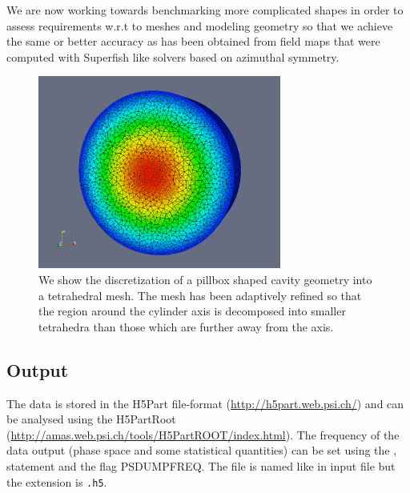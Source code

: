 We are now working towards benchmarking more complicated shapes in order to
assess requirements w.r.t to meshes and modeling geometry so that we
achieve the same or better accuracy as has been obtained from field
maps that were computed with Superfish like solvers based on azimuthal symmetry.

\begin{figure}
  \begin{center}
  \includegraphics[origin=bl,width=80mm,angle=0]{./figures/adaptivePillboxMesh.pdf}
  \caption{\label{figure_pillbox_adaptively_refined_mesh}
    We show the discretization of a pillbox shaped cavity geometry
        into a tetrahedral mesh. The mesh has been adaptively
        refined so that the region around the cylinder axis is
        decomposed into smaller tetrahedra than those which are
        further away from the axis.
  }
  \end{center}
%
\end{figure}

\clearpage
\subsection{Output}
The data is stored in the H5Part file-format (\url{http://h5part.web.psi.ch/}) and can be analysed
using the H5PartRoot (\url{http://amas.web.psi.ch/tools/H5PartROOT/index.html}). The frequency 
of the data output (phase space and some statistical quantities) can be set using the , 
statement and the flag PSDUMPFREQ. The file is named like in input file but the extension is {\tt .h5}. 


